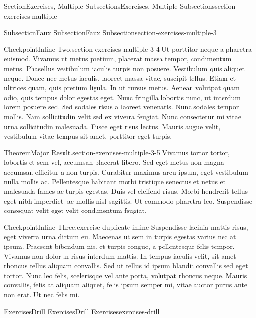 \documentclass[twoside,10pt,]{article}
\numberwithin{equation}{section}
\begin{document}
\begin{sectionptx}{Section}{Exercises, Multiple Subsections}{}{Exercises, Multiple Subsections}{}{}{section-exercises-multiple}
\begin{subsectionptx}{Subsection}{Faux Subsection}{}{Faux Subsection}{}{}{section-exercises-multiple-3}
\begin{inlineexercise}{Checkpoint}{Inline Two.}{section-exercises-multiple-3-4}%
Ut porttitor neque a pharetra euismod. Vivamus ut metus pretium, placerat massa tempor, condimentum metus. Phasellus vestibulum iaculis turpis non posuere. Vestibulum quis aliquet neque. Donec nec metus iaculis, laoreet massa vitae, suscipit tellus. Etiam et ultrices quam, quis pretium ligula. In ut cursus metus. Aenean volutpat quam odio, quis tempus dolor egestas eget. Nunc fringilla lobortis nunc, ut interdum lorem posuere sed. Sed sodales risus a laoreet venenatis. Nunc sodales tempor mollis. Nam sollicitudin velit sed ex viverra feugiat. Nunc consectetur mi vitae urna sollicitudin malesuada. Fusce eget risus lectus. Mauris augue velit, vestibulum vitae tempus sit amet, porttitor eget turpis.%
\end{inlineexercise}%
\begin{theorem}{Theorem}{Major Result.}{}{section-exercises-multiple-3-5}%
Vivamus tortor tortor, lobortis et sem vel, accumsan placerat libero. Sed eget metus non magna accumsan efficitur a non turpis. Curabitur maximus arcu ipsum, eget vestibulum nulla mollis ac. Pellentesque habitant morbi tristique senectus et netus et malesuada fames ac turpis egestas. Duis vel eleifend risus. Morbi hendrerit tellus eget nibh imperdiet, ac mollis nisl sagittis. Ut commodo pharetra leo. Suspendisse consequat velit eget velit condimentum feugiat.%
\end{theorem}
\begin{inlineexercise}{Checkpoint}{Inline Three.}{exercise-duplicate-inline}%
Suspendisse lacinia mattis risus, eget viverra urna dictum eu. Maecenas ut sem in turpis egestas varius nec at ipsum. Praesent bibendum nisi et turpis congue, a pellentesque felis tempor. Vivamus non dolor in risus interdum mattis. In tempus iaculis velit, sit amet rhoncus tellus aliquam convallis. Sed ut tellus id ipsum blandit convallis sed eget tortor. Nunc leo felis, scelerisque vel ante porta, volutpat rhoncus neque. Mauris convallis, felis at aliquam aliquet, felis ipsum semper mi, vitae auctor purus ante non erat. Ut nec felis mi.%
\end{inlineexercise}%
\end{subsectionptx}
%
%
\typeout{************************************************}
\typeout{************************************************}
%
\begin{exercises-subsection}{Exercises}{Drill Exercises}{}{Drill Exercises}{}{}{exercises-drill}

\end{exercises-subsection}
\end{sectionptx}
\end{document}
